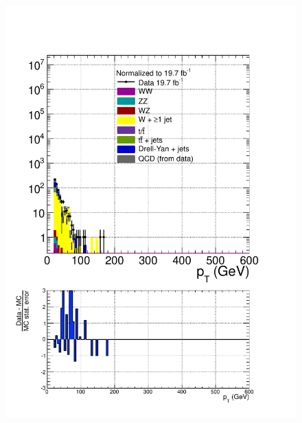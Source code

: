 \begin{figure}[hbtp]
  \begin{center}
    \includegraphics[width=\cmsFigWidth]{figures/dataVsMCQCD_tauHadPT_lowMT_v87}

\end{center}
\end{figure}
